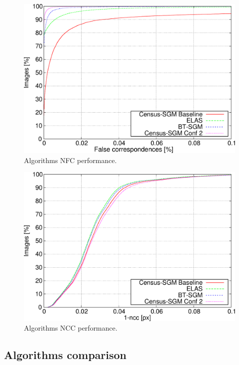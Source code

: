 \begin{figure}[p]
  \centering
  \includegraphics[width=\textwidth, height=0.4\textheight, trim=0 0 0 0,clip]{algo_nfc_perc}
  \caption{  Algorithms NFC performance.}
  \label{fig:cp03_algorithms_NFC}
\end{figure}%

\begin{figure}[p]
  \centering
  \includegraphics[width=\textwidth, height=0.4\textheight, trim=0 0 0 0,clip]{algo_ncc}
  \caption{ Algorithms NCC performance.}
  \label{fig:cp03_algorithms_NCC}
\end{figure}%

\subsection{Algorithms comparison}\label{ch:chapter03_04_03}

